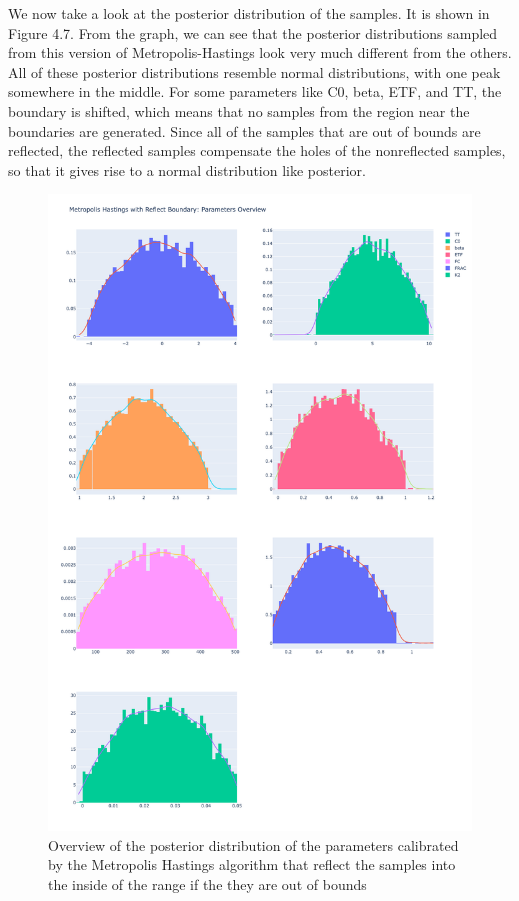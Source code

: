 We now take a look at the posterior distribution of the samples. It is shown in Figure 4.7. From the graph, we can see that the posterior distributions sampled from this version of Metropolis-Hastings look very much different from the others. All of these posterior distributions resemble normal distributions, with one peak somewhere in the middle. For some parameters like C0, beta, ETF, and TT, the boundary is shifted, which means that no samples from the region near the boundaries are generated. Since all of the samples that are out of bounds are reflected, the reflected samples compensate the holes of the nonreflected samples, so that it gives rise to a normal distribution like posterior.

\begin{figure}
    \centering
    \includegraphics[width=1\textwidth]{figures/basic_mh/rb_mh/rb_mh_parameters_overview.png}
    \captionsetup{width=.8\textwidth}
    \caption{Overview of the posterior distribution of the parameters calibrated by the Metropolis Hastings algorithm that reflect the samples into the inside of the range if the they are out of bounds}
    \label{fig:enter-label}
\end{figure}

